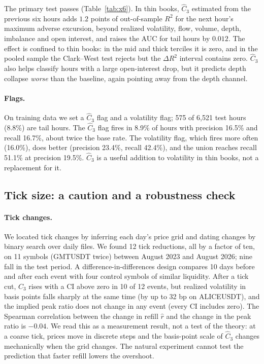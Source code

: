 The primary test passes (Table~\ref{tab:x6}). In thin books, $\hat C_3$ estimated from the previous six hours adds $1.2$ points of out-of-sample $R^2$ for the next hour's maximum adverse excursion, beyond realized volatility, flow, volume, depth, imbalance and open interest, and raises the AUC for tail hours by $0.012$. The effect is confined to thin books: in the mid and thick terciles it is zero, and in the pooled sample the Clark--West test rejects but the $\Delta R^2$ interval contains zero. $\hat C_3$ also helps classify hours with a large open-interest drop, but it predicts depth collapse \emph{worse} than the baseline, again pointing away from the depth channel.

\paragraph{Flags.} On training data we set a $\hat C_3$ flag and a volatility flag; 575 of 6{,}521 test hours (8.8\%) are tail hours. The $\hat C_3$ flag fires in 8.9\% of hours with precision 16.5\% and recall 16.7\%, about twice the base rate. The volatility flag, which fires more often (16.0\%), does better (precision 23.4\%, recall 42.4\%), and the union reaches recall 51.1\% at precision 19.5\%. $\hat C_3$ is a useful addition to volatility in thin books, not a replacement for it.

\subsection{Tick size: a caution and a robustness check}\label{sec:tick}

\paragraph{Tick changes.} We located tick changes by inferring each day's price grid and dating changes by binary search over daily files. We found 12 tick reductions, all by a factor of ten, on 11 symbols (GMTUSDT twice) between August 2023 and August 2026; nine fall in the test period. A difference-in-differences design compares 10 days before and after each event with four control symbols of similar liquidity. After a tick cut, $\hat C_3$ rises with a CI above zero in 10 of 12 events, but realized volatility in basis points falls sharply at the same time (by up to 32 bp on ALICEUSDT), and the implied peak ratio does not change in any event (every CI includes zero). The Spearman correlation between the change in refill $\hat r$ and the change in the peak ratio is $-0.04$. We read this as a measurement result, not a test of the theory: at a coarse tick, prices move in discrete steps and the basis-point scale of $\hat C_3$ changes mechanically when the grid changes. The natural experiment cannot test the prediction that faster refill lowers the overshoot.

